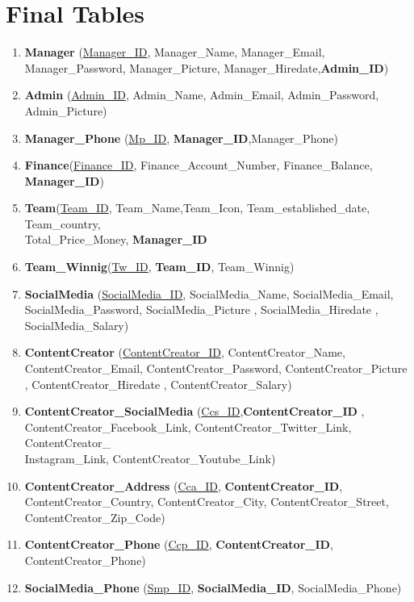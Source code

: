 \vspace{3cm}
\section{Final Tables}
\hrulefill
\begin{enumerate}
    \item \textbf{Manager} (\underline{Manager\_ID}, Manager\_Name, Manager\_Email, Manager\_Password, Manager\_Picture, Manager\_Hiredate,\textbf{Admin\_ID})
    \item \textbf{Admin} (\underline{Admin\_ID}, Admin\_Name, Admin\_Email, Admin\_Password, Admin\_Picture)
    \item \textbf{Manager\_Phone} (\underline{Mp\_ID}, \textbf{Manager\_ID},{Manager\_Phone})


    \item \textbf{Finance}(\underline{Finance\_ID}, Finance\_Account\_Number, Finance\_Balance,\textbf{ Manager\_ID})


    \item \textbf{Team}(\underline{Team\_ID}, Team\_Name,Team\_Icon, Team\_established\_date, Team\_country,\\Total\_Price\_Money, \textbf{Manager\_ID}
    \item \textbf{Team\_Winnig}(\underline{Tw\_ID}, \textbf{Team\_ID}, Team\_Winnig)



    \item \textbf{SocialMedia} (\underline{SocialMedia\_ID}, SocialMedia\_Name, SocialMedia\_Email, SocialMedia\_Password, SocialMedia\_Picture , SocialMedia\_Hiredate , SocialMedia\_Salary)
    \item \textbf{ContentCreator} (\underline{ContentCreator\_ID}, ContentCreator\_Name, ContentCreator\_Email, ContentCreator\_Password, ContentCreator\_Picture , ContentCreator\_Hiredate , ContentCreator\_Salary)
    \item \textbf{ContentCreator\_SocialMedia} (\underline{Ccs\_ID},\textbf{ContentCreator\_ID} , ContentCreator\_Facebook\_Link, ContentCreator\_Twitter\_Link, ContentCreator\_\\Instagram\_Link, ContentCreator\_Youtube\_Link)
    \item \textbf{ContentCreator\_Address} (\underline{Cca\_ID}, \textbf{ContentCreator\_ID}, ContentCreator\_Country, ContentCreator\_City, ContentCreator\_Street, ContentCreator\_Zip\_Code)
    \item \textbf{ContentCreator\_Phone} (\underline{Ccp\_ID}, \textbf{ContentCreator\_ID}, ContentCreator\_Phone)
    \item \textbf{SocialMedia\_Phone} (\underline{Smp\_ID}, \textbf{SocialMedia\_ID}, SocialMedia\_Phone)


\end{enumerate}
